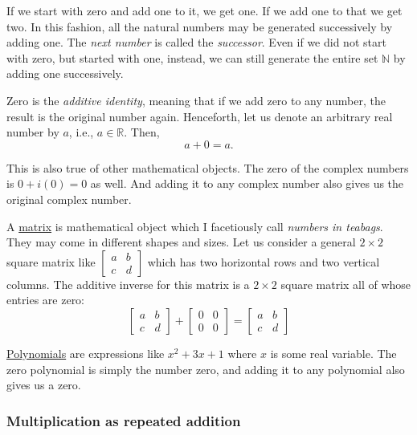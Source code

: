 \documentclass[
  a4paper,
]{article}
\begin{document}
If we start with zero and add one to it, we get one. If we add one to
that we get two. In this fashion, all the natural numbers may be
generated successively by adding one. The \emph{next number} is called
the \emph{successor}. Even if we did not start with zero, but started
with one, instead, we can still generate the entire set \(\mathbb{N}\)
by adding one successively.

Zero is the \emph{additive identity}, meaning that if we add zero to any
number, the result is the original number again. Henceforth, let us
denote an arbitrary real number by \(a\), i.e., \(a \in \mathbb{R}\).
Then, \[
a + 0 = a.
\]

This is also true of other mathematical objects. The zero of the complex
numbers is \(0 + i(0) = 0\) as well. And adding it to any complex number
also gives us the original complex number.

A \href{https://mathworld.wolfram.com/Matrix.html}{matrix} is
mathematical object which I facetiously call \emph{numbers in teabags}.
They may come in different shapes and sizes. Let us consider a general
\(2 \times 2\) square matrix like
\(\begin{bmatrix}a & b\\c & d\end{bmatrix}\) which has two horizontal
rows and two vertical columns. The additive inverse for this matrix is a
\(2\times2\) square matrix all of whose entries are zero: \[
\begin{bmatrix}
a & b\\
c & d
\end{bmatrix}
+
\begin{bmatrix}
0 & 0\\
0 & 0
\end{bmatrix}
=
\begin{bmatrix}
a & b\\
c & d
\end{bmatrix}
\]

\href{https://mathworld.wolfram.com/Polynomial.html}{Polynomials} are
expressions like \(x^2 + 3x + 1\) where \(x\) is some real variable. The
zero polynomial is simply the number zero, and adding it to any
polynomial also gives us a zero.

\hypertarget{multiplication-as-repeated-addition}{%
\subsubsection{Multiplication as repeated
addition}\label{multiplication-as-repeated-addition}}
\end{document}
